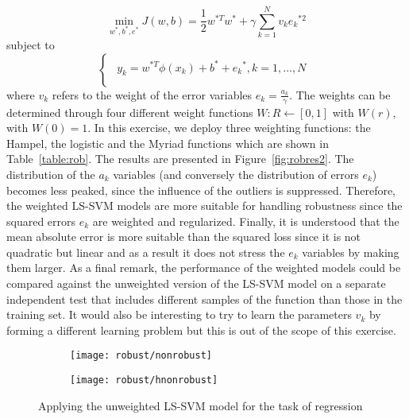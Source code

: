 \documentclass[conference,compsoc]{IEEEtran}
\begin{document}
\begin{equation}
\min\limits_{w^{*},b^{*},e^{*}} J(w,b) = \frac{1}{2}w^{*T}w^{*} + \gamma \sum_{k=1}^{N}v_k{e_k}^{*2}
\end{equation}
subject to
\begin{equation*}
\begin{cases}
\begin{aligned}
  y_k = w^{*T}\phi(x_k)+b^*+{e_k}^*,  k=1,...,N \\

\end{aligned}
\end{cases}
\end{equation*}
where $v_k$ refers to the weight of the error variables $e_k=\frac{a_k}{\gamma}$. The weights can be determined through four different weight functions $W:R \leftarrow[0,1]$ with $W(r)$, with $W(0)=1$.  In this exercise, we deploy three weighting functions: the Hampel, the logistic and the Myriad functions which are shown in Table~\ref{table:rob}. The results are presented in Figure~\ref{fig:robres2}. The distribution of the $a_k$ variables (and conversely the distribution of errors $e_k$) becomes less peaked, since the influence of the outliers is suppressed. Therefore, the weighted LS-SVM models are more suitable for handling robustness since the squared errors $e_k$ are weighted and regularized. 
 Finally, it is understood that the mean absolute error is more suitable than the squared loss since it is not quadratic but linear and as a result it does not stress the $e_k$ variables by making them larger.
As a final remark, the performance of the weighted models could be compared against the unweighted version of the LS-SVM model on a separate independent test that includes different samples  of the function than those in the training set. It would also be interesting  to try to learn the parameters $v_k$ by forming a different learning problem but this is out of the scope of this exercise.



\begin{figure*}[]
        \begin{subfigure}{0.45\linewidth}
            \texttt{[image: robust/nonrobust]}
            \caption{}
        \end{subfigure}
                \begin{subfigure}{0.45\linewidth}
            \texttt{[image: robust/hnonrobust]}
            \caption{}
        \end{subfigure}
        
                  
\caption{Applying the unweighted LS-SVM model for the task of regression}        
                   
        \label{fig:rob1}
    \end{figure*}
\end{document}
